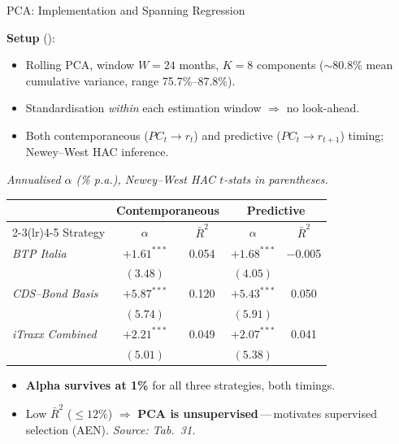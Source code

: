 \documentclass[aspectratio=169,11pt]{beamer}
\newcommand{\hlt}[1]{\textcolor{edhecred}{\textbf{#1}}}     %
\newcommand{\hltb}[1]{\textcolor{accentblue}{\textbf{#1}}}  %
\begin{document}
\begin{frame}[t]{PCA: Implementation and Spanning Regression}
\small

\textbf{Setup} (\citealp{ludvigson2009macro}):
\begin{itemize}\itemsep=0.05cm\footnotesize
  \item Rolling PCA, window $W = 24$ months, $K = 8$ components ($\sim$80.8\% mean cumulative variance, range 75.7\%--87.8\%).
  \item Standardisation \emph{within} each estimation window $\Rightarrow$ no look-ahead.
  \item Both contemporaneous ($PC_t \to r_t$) and predictive ($PC_t \to r_{t+1}$) timing;
        Newey--West HAC inference.
\end{itemize}

\vspace{0.25cm}

\centering
\scriptsize
\textit{Annualised $\alpha$ (\% p.a.), Newey--West HAC $t$-stats in parentheses.}

\vspace{0.15cm}
\renewcommand{\arraystretch}{1.10}
\setlength{\tabcolsep}{8pt}
\begin{tabular}{lcccc}
\toprule
 & \multicolumn{2}{c}{Contemporaneous} & \multicolumn{2}{c}{Predictive} \\
\cmidrule(lr){2-3}\cmidrule(lr){4-5}
Strategy & $\alpha$ & $\bar R^2$ & $\alpha$ & $\bar R^2$ \\
\midrule
\textit{BTP Italia}      & \hlt{$+1.61^{***}$} & 0.054 & $+1.68^{***}$ & $-$0.005 \\
                          & $(3.48)$            &      & $(4.05)$       &        \\
\textit{CDS--Bond Basis} & \hlt{$+5.87^{***}$} & 0.120 & $+5.43^{***}$ & 0.050 \\
                          & $(5.74)$            &      & $(5.91)$       &        \\
\textit{iTraxx Combined} & \hlt{$+2.21^{***}$} & 0.049 & $+2.07^{***}$ & 0.041 \\
                          & $(5.01)$            &      & $(5.38)$       &        \\
\bottomrule
\end{tabular}

\vspace{0.20cm}

\begin{itemize}\itemsep=0.04cm\scriptsize
  \item \hlt{Alpha survives at 1\%} for all three strategies, both timings.
  \item Low $\bar R^2$ ($\leq\!12\%$) $\Rightarrow$ \hltb{PCA is unsupervised}\,---\,motivates supervised selection (AEN). \emph{Source: Tab.\ 31.}
\end{itemize}

\end{frame}
\end{document}
